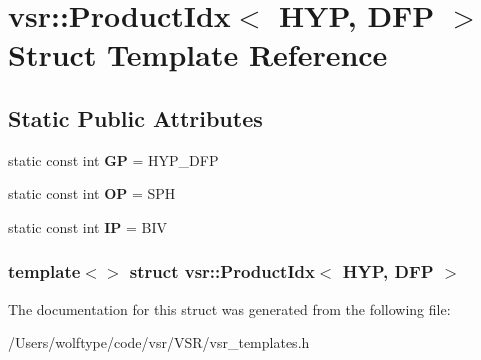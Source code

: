 \hypertarget{structvsr_1_1_product_idx_3_01_h_y_p_00_01_d_f_p_01_4}{\section{vsr\-:\-:Product\-Idx$<$ H\-Y\-P, D\-F\-P $>$ Struct Template Reference}
\label{structvsr_1_1_product_idx_3_01_h_y_p_00_01_d_f_p_01_4}
}
\subsection*{Static Public Attributes}
\begin{DoxyCompactItemize}
\item 
\hypertarget{structvsr_1_1_product_idx_3_01_h_y_p_00_01_d_f_p_01_4_a5926a2ea6b189f090247376ed1282aaf}{static const int {\bfseries G\-P} = H\-Y\-P\-\_\-\-D\-F\-P}\label{structvsr_1_1_product_idx_3_01_h_y_p_00_01_d_f_p_01_4_a5926a2ea6b189f090247376ed1282aaf}

\item 
\hypertarget{structvsr_1_1_product_idx_3_01_h_y_p_00_01_d_f_p_01_4_a0f3d350847c3a2f763d468f581e42c52}{static const int {\bfseries O\-P} = S\-P\-H}\label{structvsr_1_1_product_idx_3_01_h_y_p_00_01_d_f_p_01_4_a0f3d350847c3a2f763d468f581e42c52}

\item 
\hypertarget{structvsr_1_1_product_idx_3_01_h_y_p_00_01_d_f_p_01_4_a807b7875adf2fdf94da86b85264ba35d}{static const int {\bfseries I\-P} = B\-I\-V}\label{structvsr_1_1_product_idx_3_01_h_y_p_00_01_d_f_p_01_4_a807b7875adf2fdf94da86b85264ba35d}

\end{DoxyCompactItemize}
\subsubsection*{template$<$$>$ struct vsr\-::\-Product\-Idx$<$ H\-Y\-P, D\-F\-P $>$}



The documentation for this struct was generated from the following file\-:\begin{DoxyCompactItemize}
\item 
/\-Users/wolftype/code/vsr/\-V\-S\-R/vsr\-\_\-templates.\-h\end{DoxyCompactItemize}
